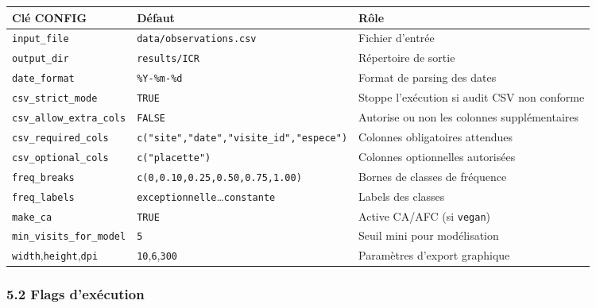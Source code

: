 {\def\LTcaptype{none} %
\begin{longtable}[]{@{}
  >{\raggedright\arraybackslash}p{}
  >{\raggedright\arraybackslash}p{}
  >{\raggedright\arraybackslash}p{}@{}}
\toprule\noalign{}
\begin{minipage}[b]{\linewidth}\raggedright
Clé CONFIG
\end{minipage} & \begin{minipage}[b]{\linewidth}\raggedright
Défaut
\end{minipage} & \begin{minipage}[b]{\linewidth}\raggedright
Rôle
\end{minipage} \\
\midrule\noalign{}
\endhead
\bottomrule\noalign{}
\endlastfoot
\texttt{input\_file} & \texttt{data/observations.csv} & Fichier
d'entrée \\
\texttt{output\_dir} & \texttt{results/ICR} & Répertoire de sortie \\
\texttt{date\_format} & \texttt{\%Y-\%m-\%d} & Format de parsing des
dates \\
\texttt{csv\_strict\_mode} & \texttt{TRUE} & Stoppe l'exécution si audit
CSV non conforme \\
\texttt{csv\_allow\_extra\_cols} & \texttt{FALSE} & Autorise ou non les
colonnes supplémentaires \\
\texttt{csv\_required\_cols} &
\texttt{c("site","date","visite\_id","espece")} & Colonnes obligatoires
attendues \\
\texttt{csv\_optional\_cols} & \texttt{c("placette")} & Colonnes
optionnelles autorisées \\
\texttt{freq\_breaks} & \texttt{c(0,0.10,0.25,0.50,0.75,1.00)} & Bornes
de classes de fréquence \\
\texttt{freq\_labels} &
\texttt{exceptionnelle}\ldots{}\texttt{constante} & Labels des
classes \\
\texttt{make\_ca} & \texttt{TRUE} & Active CA/AFC (si \texttt{vegan}) \\
\texttt{min\_visits\_for\_model} & \texttt{5} & Seuil mini pour
modélisation \\
\texttt{width},\texttt{height},\texttt{dpi} &
\texttt{10},\texttt{6},\texttt{300} & Paramètres d'export graphique \\
\end{longtable}
}

\subsubsection{5.2 Flags d'exécution}\label{flags-dexuxe9cution}


